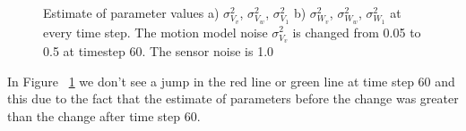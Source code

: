 \documentclass[12pt]{dalcsthesis}
\begin{document}
\begin{figure}[h!]
  \centering
     \qquad
  \caption{\label{fig-varying_sensor_noise_motion_model} Estimate of parameter values a) $\sigma_{V_{v}}^{2}$, $\sigma_{V_{w}}^{2}$,  $\sigma_{V_{1}}^{2}$ b)  $\sigma_{W_{v}}^{2}$, $\sigma_{W_{w}}^{2}$, $\sigma_{W_{1}}^{2}$ at every time step. The motion model noise $\sigma_{V_{v}}^{2}$ is changed from 0.05 to 0.5 at timestep 60. The sensor noise is 1.0}
\end{figure}

In Figure ~\ref{fig-varying_sensor_noise_motion_model} we don't see a jump in the red line or green line at time step 60 and this due to the fact that the estimate of parameters before the change was greater than the change after time step 60. 
\end{document}
